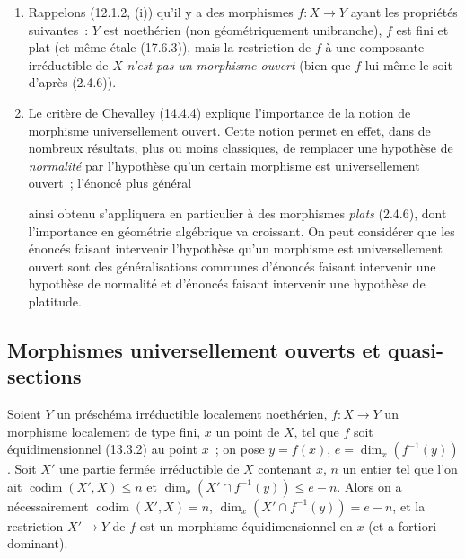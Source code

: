 \begin{remarks}[14.4.10]
\begin{enumerate}[label=(\roman*)]
  Rappelons toutefois (12.1.1.5) que si $Y$ est localement noethérien, $f:X\to Y$
  de type fini et \emph{plat}, alors toute composante irréductible de $X$ est
  \emph{équidimensionnelle} sur $Y$ (et par suite la restriction de $f$ à une telle
  composante est \emph{universellement ouverte} si tous les points de $Y$ sont
  \emph{géométriquement unibranches}).

  \item Rappelons (12.1.2, (i)) qu'il y a des morphismes $f:X\to Y$ ayant les
  propriétés suivantes~: $Y$ est noethérien (non géométriquement unibranche), $f$
  est fini et plat (et même étale (17.6.3)), mais la restriction de $f$ à une
  composante irréductible de $X$ \emph{n'est pas un morphisme ouvert} (bien que $f$
  lui-même le soit d'après (2.4.6)).

  \item Le critère de Chevalley (14.4.4) explique l'importance de la notion de
  morphisme universellement ouvert. Cette notion permet en effet, dans de nombreux
  résultats, plus ou moins classiques, de remplacer une hypothèse de \emph{normalité}
  par l'hypothèse qu'un certain morphisme est universellement ouvert~; l'énoncé plus
  général


  ainsi obtenu s'appliquera en particulier à des morphismes \emph{plats} (2.4.6),
  dont l'importance en géométrie algébrique va croissant. On peut considérer que
  les énoncés faisant intervenir l'hypothèse qu'un morphisme est universellement
  ouvert sont des généralisations communes d'énoncés faisant intervenir une
  hypothèse de normalité et d'énoncés faisant intervenir une hypothèse de platitude.
\end{enumerate}
\end{remarks}

\subsection{Morphismes universellement ouverts et quasi-sections}
\label{subsection:IV.14.5-fr}

\begin{lemma}[14.5.1]
\label{IV.14.5.1-fr}
Soient $Y$ un préschéma irréductible localement noethérien, $f:X\to Y$ un
morphisme localement de type fini, $x$ un point de $X$, tel que $f$ soit
équidimensionnel (13.3.2) au point $x$~; on pose $y=f(x)$,
$e=\dim_x(f^{-1}(y))$. Soit $X'$ une partie fermée irréductible de $X$ contenant
$x$, $n$ un entier tel que l'on ait $\operatorname{codim}(X',X)\leq n$ et
$\dim_x(X'\cap f^{-1}(y))\leq e-n$. Alors on a nécessairement
$\operatorname{codim}(X',X)=n$, $\dim_x(X'\cap f^{-1}(y))=e-n$, et la restriction $X'\to Y$
de $f$ est un morphisme équidimensionnel en $x$ (et a fortiori dominant).
\end{lemma}

